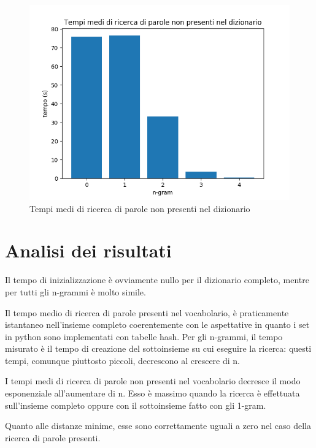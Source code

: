 \documentclass[]{article}
\begin{document}
\begin{figure}[H]
	\includegraphics{tempi_ricerca_parole_non_presenti}
	\caption{Tempi medi di ricerca di parole non presenti nel dizionario}
	\label{tempiParoleNonPresenti}
\end{figure}


\section{Analisi dei risultati}
Il tempo di inizializzazione è ovviamente nullo per il dizionario completo, mentre per tutti gli n-grammi è molto simile.

Il tempo medio di ricerca di parole presenti nel vocabolario, è praticamente istantaneo nell'insieme completo coerentemente con le aspettative in quanto i set in python sono implementati con tabelle hash. Per gli n-grammi, il tempo misurato è il tempo di creazione del sottoinsieme su cui eseguire la ricerca: questi tempi, comunque piuttosto piccoli, decrescono al crescere di n.

I tempi medi di ricerca di parole non presenti nel vocabolario decresce il modo esponenziale all'aumentare di n. Esso è massimo quando la ricerca è effettuata sull'insieme completo oppure con il sottoinsieme fatto con gli 1-gram.

Quanto alle distanze minime, esse sono correttamente uguali a zero nel caso della ricerca di parole presenti.
\end{document}
